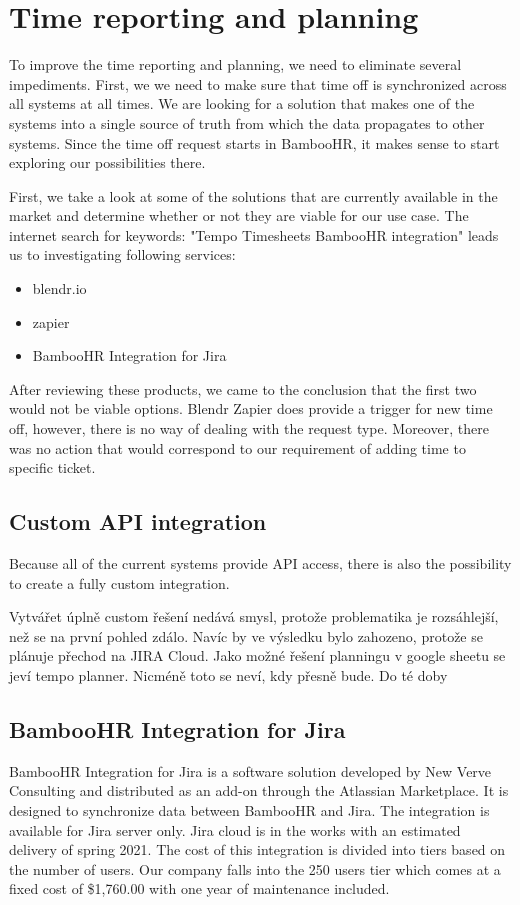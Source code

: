 \documentclass[12pt,oneside]{fithesis2}
\begin{document}
\section{Time reporting and planning}
To improve the time reporting and planning, we need to eliminate several impediments. First, we we need to make sure that time off is synchronized across all systems at all times. We are looking for a solution that makes one of the systems into a single source of truth from which the data propagates to other systems. Since the time off request starts in BambooHR, it makes sense to start exploring our possibilities there.

First, we take a look at some of the solutions that are currently available in the market and determine whether or not they are viable for our use case. The internet search for keywords: "Tempo Timesheets BambooHR integration" leads us to investigating following services:
\begin{itemize}
    \setlength\itemsep{0em}
    \item blendr.io 
    \item zapier
    \item BambooHR Integration for Jira
\end{itemize}

After reviewing these products, we came to the conclusion that the first two would not be viable options. Blendr \cite{blendr} Zapier does provide a trigger for new time off, however, there is no way of dealing with the request type. Moreover, there was no action that would correspond to our requirement of adding time to specific ticket.\cite{zapier}

\subsection*{Custom API integration}
Because all of the current systems provide API access, there is also the possibility to create a fully custom integration.


Vytvářet úplně custom řešení nedává smysl, protože problematika je rozsáhlejší, než se na první pohled zdálo. Navíc by ve výsledku bylo zahozeno, protože se plánuje přechod na JIRA Cloud. Jako možné řešení planningu v google sheetu se jeví tempo planner. Nicméně toto se neví, kdy přesně bude. Do té doby 


\subsection*{BambooHR Integration for Jira}
BambooHR Integration for Jira is a software solution developed by New Verve Consulting and distributed as an add-on through the Atlassian Marketplace. It is designed to synchronize data between BambooHR and Jira. The integration is available for Jira server only. Jira cloud is in the works with an estimated delivery of spring 2021. The cost of this integration is divided into tiers based on the number of users. Our company falls into the 250 users tier which comes at a fixed cost of \$1,760.00 with one year of maintenance included.
\end{document}
